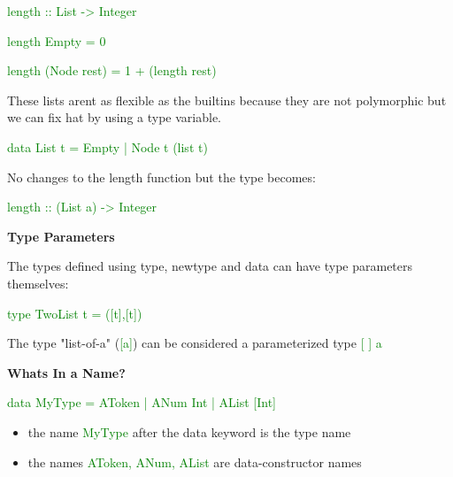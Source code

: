 \documentclass{article}
\begin{document}
\begin{itemize}
\textcolor{green}{length  ::  List -> Integer}

\textcolor{green}{length  Empty = 0}

\textcolor{green}{length  (Node  \textunderscore  rest) = 1 + (length  rest)}


These lists arent as flexible as the builtins because they are not polymorphic but we can fix hat by using a type variable.

\textcolor{green}{data List t = Empty}
\textcolor{green}{ | Node t (list t)}

No changes to the length function but the type becomes:

\textcolor{green}{length  ::  (List  a) -> Integer}


\textbf{Type Parameters}

The types defined using type, newtype and data can have type parameters themselves:

\textcolor{green}{type TwoList  t = ([t],[t])}

The type "list-of-a" (\textcolor{green}{[a]}) can be considered a parameterized type \textcolor{green}{ [ ]  a}


\textbf{Whats In a Name?}

\textcolor{green}{data MyType = AToken | ANum Int | AList [Int]}

\begin{itemize}
\item the name \textcolor{green}{MyType} after the data keyword is the type name
\item the names \textcolor{green}{AToken, ANum, AList} are data-constructor names
\end{itemize}


\end{itemize}
\end{document}
